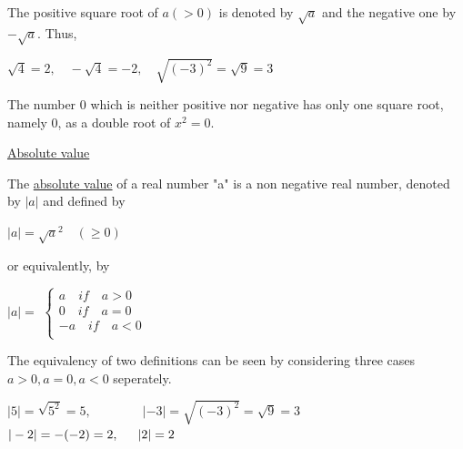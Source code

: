 \documentclass[11pt]{amsbook}
\begin{document}
	The positive square root of $a(>0)$ is denoted by $\sqrt a $ and the negative one by $-\sqrt a$. Thus, \par

	\medskip

	{\centering $\sqrt 4 = 2, \quad -\sqrt4 = -2, \quad \sqrt{(-3)^2} = \sqrt9 = 3$  \\} 

	\medskip 
	
	The number $0$ which is neither positive nor negative has only one square root, namely $0$, as a double root of $x^2 = 0$.  \\ \par

	\underline{ Absolute value \\} 
	
	The \underline {absolute value} of a real number "a" is a non negative real number, denoted by $|a|$ and defined by \\ \par
	
	\medskip
	
	{\centering $ |a| = \sqrt a^2 \quad (\geq 0)$  \\}

	\medskip
	
	or equivalently, by \\
	
	\medskip

	{\centering $ |a| = $  $\begin{cases}

		a \quad if \quad a>0  \\

		0 \quad if \quad a=0 \\

		-a \quad if \quad a<0 \\

	\end{cases}  $\\}

	\medskip
	
	The equivalency of two definitions can be seen by considering three cases $a>0, a=0, a<0$ seperately.

	\medskip

	$ |5| = \sqrt {5^2} = 5, \quad \quad \quad \quad |-3| = \sqrt{(-3)^2} = \sqrt 9 = 3 $ \\

	$ |-2| = -(-2) = 2, \quad \enskip |2| = 2$ \\
\end{document}
